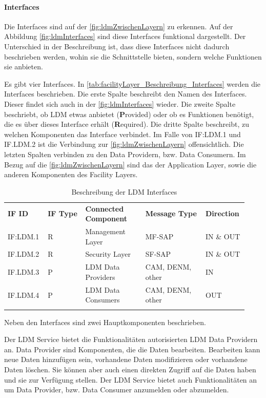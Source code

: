 \paragraph{Interfaces}
Die Interfaces sind auf der \autoref{fig:ldmZwischenLayern} zu erkennen. Auf der Abbildung \autoref{fig:ldmInterfaces} sind diese Interfaces funktional dargestellt. Der Unterschied in der Beschreibung ist, dass diese Interfaces nicht dadurch beschrieben werden, wohin sie die Schnittstelle bieten, sondern welche Funktionen sie anbieten.

Es gibt vier Interfaces. In \autoref{tab:facilityLayer_Beschreibung_Interfaces} werden die Interfaces beschrieben. Die erste Spalte beschreibt den Namen des Interfaces. Dieser findet sich auch in der \autoref{fig:ldmInterfaces} wieder. Die zweite Spalte beschriebt, ob \ac{LDM} etwas anbietet (\textbf{P}rovided) oder ob es Funktionen benötigt, die es über dieses Interface erhält (\textbf{R}equired). Die dritte Spalte beschreibt, zu welchen Komponenten das Interface verbindet. Im Falle von IF:LDM.1 und IF.LDM.2 ist die Verbindung zur \autoref{fig:ldmZwischenLayern} offensichtlich. Die letzten Spalten verbinden zu den Data Providern, bzw. Data Consumern. Im Bezug auf die \autoref{fig:ldmZwischenLayern} sind das der Application Layer, sowie die anderen Komponenten des Facility Layers. 

 \begin{longtable}{| p{0.15\linewidth} | p{0.15\linewidth} | p{0.24\linewidth} |p{0.24\linewidth}| p{0.15\linewidth}|}
 \hline
 \textbf{IF ID} & \textbf{IF Type} & \textbf{Connected Component} &  \textbf{Message Type}&\textbf{Direction} \\
IF:LDM.1 & R & Management Layer & MF-SAP & IN \& OUT \\
\hline
IF.LDM.2 & R & Security Layer & SF-SAP & IN \& OUT \\
\hline
IF.LDM.3 & P & LDM Data Providers & CAM, DENM, other & IN \\
\hline
IF.LDM.4 & P & LDM Data Consumers & CAM, DENM, other & OUT \\
\hline 
\caption{Beschreibung der LDM Interfaces \cite{en302895}}
\label{tab:facilityLayer_Beschreibung_Interfaces}
\end{longtable}

Neben den Interfaces sind zwei Hauptkomponenten beschrieben. 

Der \ac{LDM} Service bietet die Funktionalitäten autorisierten \ac{LDM} Data Providern an. Data Provider sind Komponenten, die die Daten bearbeiten. Bearbeiten kann neue Daten hinzufügen sein, vorhandene Daten modifizieren oder vorhandene Daten löschen. Sie können aber auch einen direkten Zugriff auf die Daten haben und sie zur Verfügung stellen. Der \ac{LDM} Service bietet auch Funktionalitäten an um Data Provider, bzw. Data Consumer anzumelden oder abzumelden. 

